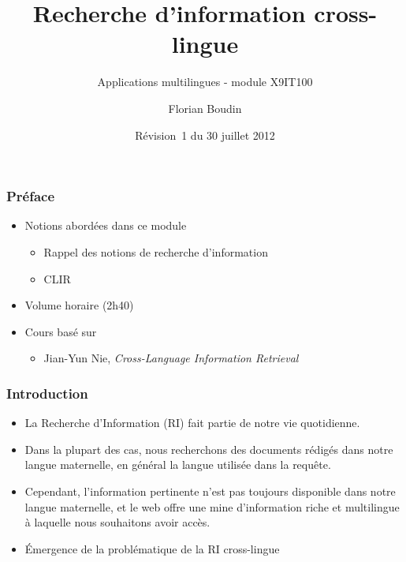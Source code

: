 \documentclass[12pt,aspectratio=43,dvipsnames,table]{beamer}
\title{Recherche d'information cross-lingue}
\subtitle{Applications multilingues - module X9IT100}
\author{Florian Boudin}
\institute{Département informatique, Université de Nantes}
\date[30 juillet 2013 / Rév.~1]{Révision~1 du 30 juillet 2012}
\begin{document}
\frame[plain]{\titlepage}


\begin{frame}
    \frametitle{Préface}
    \begin{itemize} \itemsep10pt
        \item Notions abordées dans ce module
        \begin{itemize}
            \item Rappel des notions de recherche d'information
            \item CLIR
        \end{itemize}
        \item Volume horaire (2h40)
        \item Cours basé sur
        \begin{itemize}
            \item \cite{DBLP:series/synthesis/2010Nie} Jian-Yun Nie, 
                  \textit{Cross-Language Information Retrieval}
        \end{itemize}
    \end{itemize}
\end{frame}


\begin{frame}
    \frametitle{Introduction}
    \begin{itemize} \itemsep10pt
        \item La Recherche d'Information (RI) fait partie de notre vie 
              quotidienne.
        \item Dans la plupart des cas, nous recherchons des documents rédigés 
              dans notre langue maternelle, en général la langue utilisée dans
              la requête.
        \item Cependant, l'information pertinente n'est pas toujours disponible
              dans notre langue maternelle, et le web offre une mine 
              d'information riche et multilingue à laquelle nous souhaitons 
              avoir accès.
        \item \'Emergence de la problématique de la RI cross-lingue
    \end{itemize}
\end{frame}
\end{document}
